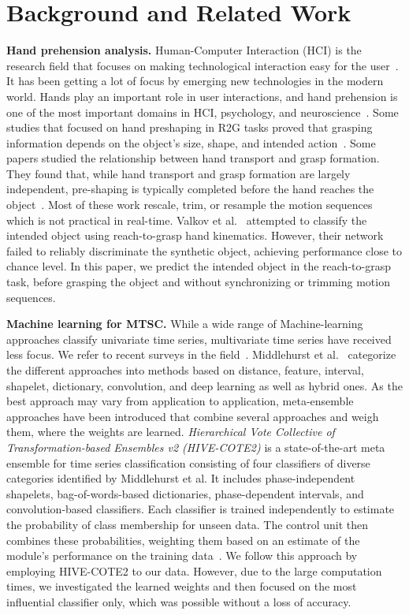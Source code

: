 \section{Background and Related Work}
\label{sec:related}
\textbf{Hand prehension analysis.}
Human-Computer Interaction (HCI) is the research field that focuses on making technological interaction easy for the user~\cite{nazar2021systematic}. It has been getting a lot of focus by emerging new technologies in the modern world. Hands play an important role in user interactions, and hand prehension is one of the most important domains in HCI, psychology, and neuroscience~\cite{valkov2023reach}. Some studies that focused on hand preshaping in R2G tasks proved that grasping information depends on the object's size, shape, and intended action~\cite{betti2018reach, egmose2018shaping}. Some papers studied the relationship between hand transport and grasp formation. They found that, while hand transport and grasp formation are largely independent, pre-shaping is typically completed before the hand reaches the object~\cite{chieffi1993coordination, ansuini2015predicting, santello1998gradual, molina2002neural, daiber2012towards}. Most of these work rescale, trim, or resample the motion sequences which is not practical in real-time. Valkov et al.~\cite{valkov2023reach} attempted to classify the intended object using reach-to-grasp hand kinematics. However, their network failed to reliably discriminate the synthetic object, achieving performance close to chance level. In this paper, we predict the intended object in the reach-to-grasp task, before grasping the object and without synchronizing or trimming motion sequences.

\noindent
\textbf{Machine learning for MTSC.}
While a wide range of Machine-learning approaches classify univariate time series, multivariate time series have received less focus. We refer to recent surveys in the field~\cite{middlehurst2024bake, wen2023transformers, ahmed2023transformers}. Middlehurst et al.~\cite{middlehurst2024bake} categorize the different approaches into methods based on distance, feature, interval, shapelet, dictionary, convolution, and deep learning as well as hybrid ones. As the best approach may vary from application to application, meta-ensemble approaches have been introduced that combine several approaches and weigh them, where the weights are learned. \textit{Hierarchical Vote Collective of Transformation-based Ensembles v2 (HIVE-COTE2)} is a state-of-the-art meta ensemble for time series classification consisting of four classifiers of diverse categories identified by Middlehurst et al. It includes phase-independent shapelets, bag-of-words-based dictionaries, phase-dependent intervals, and convolution-based classifiers. Each classifier is trained independently to estimate the probability of class membership for unseen data. The control unit then combines these probabilities, weighting them based on an estimate of the module's performance on the training data~\cite {middlehurst2021hive}. We follow this approach by employing HIVE-COTE2 to our data. However, due to the large computation times, we investigated the learned weights and then focused on the most influential classifier only, which was possible without a loss of accuracy.

